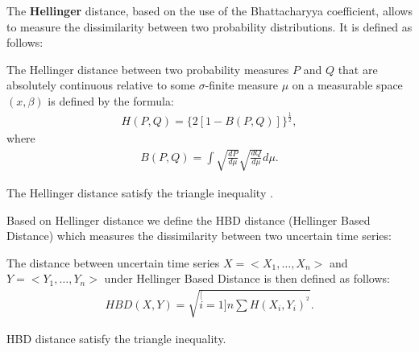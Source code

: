 The \textbf{Hellinger} distance, based on the use of the Bhattacharyya coefficient, allows to measure the dissimilarity between two probability distributions. It is defined as follows:

\begin{definition}
The Hellinger distance between two  probability measures  $P$ and $Q$ that are absolutely
continuous relative to some $\sigma$-finite measure $\mu$ on a measurable space $(x,\beta)$ is defined
by the formula:
\begin{eqnarray}
H(P,Q)=\{2[1-B(P,Q)]\}^{\frac{1}{2}},
\end{eqnarray}
where
\begin{eqnarray}
B(P,Q)=\int\sqrt{\frac{dP}{d\mu}}\sqrt{\frac{dQ}{d\mu}}d\mu.
\end{eqnarray}
\end{definition}

\begin{theorem}
\label{hellinger}
The Hellinger distance satisfy the triangle inequality \cite{ibragimov2013statistical}.
\end{theorem}

Based on Hellinger distance we define the HBD distance (Hellinger Based Distance) which measures the dissimilarity between two uncertain time series:

\begin{definition}
The distance between uncertain time series $X=<X_1, \ldots,X_n>$ and $Y=<Y_1, \ldots,Y_n>$ under
Hellinger Based Distance is then defined as follows:
\begin{eqnarray}
HBD(X,Y)=\sqrt{\stackrel[i=1]{n}{\sum}H(X_{i},Y_{i})^{^{2}}}.
\end{eqnarray} 
\end{definition}

\begin{theorem}
HBD distance satisfy the triangle inequality.
\end{theorem}

